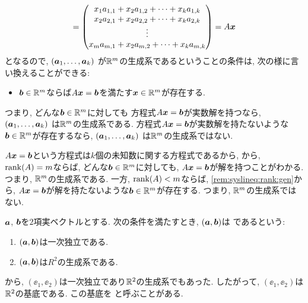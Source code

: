 \begin{remark}
\begin{align*}
    =\begin{pmatrix}x_1a_{1,1}+x_2a_{1,2}+\cdots+x_ka_{1,k}\\x_2a_{2,1}+x_2a_{2,2}+\cdots+x_ka_{2,k}\\\vdots\\x_ma_{m,1}+x_2a_{m,2}+\cdots+x_ka_{m,k}\end{pmatrix}
    =A\boldsymbol{x}
  \end{align*}
  となるので,
  $(\boldsymbol{a}_1,\ldots, \boldsymbol{a}_k)$
  が$\mathbb{R}^m$の生成系であるということの条件は, 次の様に言い換えることができる:
  \begin{itemize}
  \item $\boldsymbol{b}\in\mathbb{R}^m$ならば$A\boldsymbol{x}=\boldsymbol{b}$を満たす$\boldsymbol{x}\in \mathbb{R}^m$が存在する.
  \end{itemize}
  つまり,
  どんな$\boldsymbol{b}\in\mathbb{R}^m$に対しても
  方程式$A\boldsymbol{x}=\boldsymbol{b}$が実数解を持つなら, 
    $(\boldsymbol{a}_1,\ldots, \boldsymbol{a}_k)$
  は$\mathbb{R}^m$の生成系である.
  方程式$A\boldsymbol{x}=\boldsymbol{b}$が実数解を持たないような
  $\boldsymbol{b}\in\mathbb{R}^m$が存在するなら,
    $(\boldsymbol{a}_1,\ldots, \boldsymbol{a}_k)$
  は$\mathbb{R}^m$の生成系ではない.
  
  $A\boldsymbol{x}=\boldsymbol{b}$という方程式は$k$個の未知数に関する方程式であるから,
  から,
  $\operatorname{rank}(A)=m$ならば, どんな$\boldsymbol{b}\in\mathbb{R}^m$に対しても,
  $A\boldsymbol{x}=\boldsymbol{b}$が解を持つことがわかる.
  つまり, $\mathbb{R}^m$の生成系である.
  一方,
  $\operatorname{rank}(A)<m$ならば, 
  \cref{rem:syslineq:rank:gen}から,
  $A\boldsymbol{x}=\boldsymbol{b}$が解を持たないような$\boldsymbol{b}\in\mathbb{R}^m$が存在する.
  つまり, $\mathbb{R}^m$の生成系ではない.
\end{remark}

\begin{definition}
  \label{def:basis}
  $\boldsymbol{a}$, $\boldsymbol{b}$を$2$項実ベクトルとする.
  次の条件を満たすとき,
  $(\boldsymbol{a},\boldsymbol{b})$は
  であるという:
  \begin{enumerate}
  \item
    $(\boldsymbol{a},\boldsymbol{b})$は一次独立である.
  \item
    $(\boldsymbol{a},\boldsymbol{b})$は$R^2$の生成系である.
  \end{enumerate}
\end{definition}


\begin{example}
  \label{ex:stdbasis}
  から,
  $(\ee_1,\ee_2)$は一次独立であり$\mathbb{R}^2$の生成系でもあった.
  したがって,
  $(\ee_1,\ee_2)$は$\mathbb{R}^2$の基底である.
  この基底を
  と呼ぶことがある.
\end{example}


